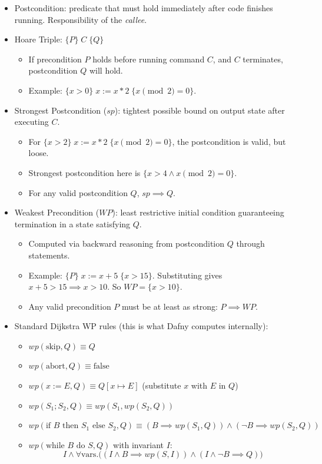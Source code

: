 \documentclass[11pt]{book}
\begin{document}
\begin{itemize}
    \item Postcondition: predicate that must hold immediately after code finishes running. Responsibility of the \emph{callee}.
    
    \item Hoare Triple: $\{P\} \; C \; \{Q\}$
    \begin{itemize}
        \item If precondition $P$ holds before running command $C$, and $C$ terminates, postcondition $Q$ will hold.
        \item Example: $\{x > 0\} \; x := x * 2 \; \{x \pmod 2 = 0\}$.
    \end{itemize}

    \item Strongest Postcondition ($sp$): tightest possible bound on output state after executing $C$.
    \begin{itemize}
        \item For $\{x > 2\} \; x := x * 2 \; \{x \pmod 2 = 0\}$, the postcondition is valid, but loose.
        \item Strongest postcondition here is $\{x > 4 \land x \pmod 2 = 0\}$.
        \item For any valid postcondition $Q$, $sp \implies Q$.
    \end{itemize}

    \item Weakest Precondition ($WP$): least restrictive initial condition guaranteeing termination in a state satisfying $Q$.
    \begin{itemize}
        \item Computed via backward reasoning from postcondition $Q$ through statements.
        \item Example: $\{P\} \; x := x + 5 \; \{x > 15\}$. Substituting gives $x + 5 > 15 \implies x > 10$. So $WP = \{x > 10\}$.
        \item Any valid precondition $P$ must be at least as strong: $P \implies WP$.
    \end{itemize}

    \item Standard Dijkstra WP rules (this is what Dafny computes internally):
    \begin{itemize}
        \item $wp(\text{skip}, Q) \equiv Q$
        \item $wp(\text{abort}, Q) \equiv \text{false}$
        \item $wp(x := E, Q) \equiv Q[x \mapsto E]$ (substitute $x$ with $E$ in $Q$)
        \item $wp(S_1; S_2, Q) \equiv wp(S_1, wp(S_2, Q))$
        \item $wp(\text{if } B \text{ then } S_1 \text{ else } S_2, Q) \equiv (B \implies wp(S_1, Q)) \land (\neg B \implies wp(S_2, Q))$
        \item $wp(\text{while } B \text{ do } S, Q)$ with invariant $I$:
        \[
        I \land \forall \text{vars}. \big((I \land B \implies wp(S, I)) \land (I \land \neg B \implies Q)\big)
        \]
    \end{itemize}


\end{itemize}
\end{document}
